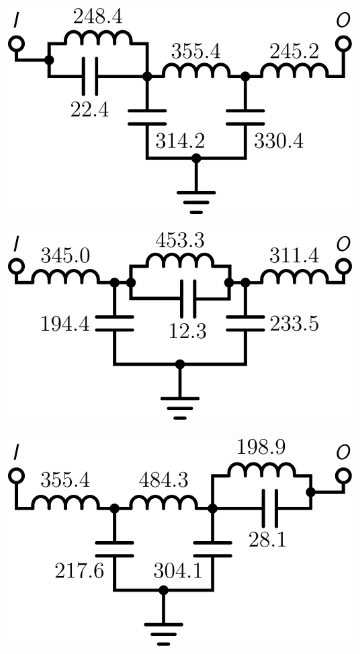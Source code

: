 \begin{figure}[h!]
\begin{subfigure}[t]{0.25\textwidth}
\centering
\includegraphics[scale = 0.14]{../app2/figures/(4)}
\caption{}
\end{subfigure}%
\begin{subfigure}[t]{0.25\textwidth}
\centering
\includegraphics[scale = 0.14]{../ch6/figures/lpf3_circuit4}
\caption{}
\end{subfigure}%
\begin{subfigure}[t]{0.25\textwidth}
\centering
\includegraphics[scale = 0.14]{../ch6/figures/lpf3_circuit2}
\caption{}
\end{subfigure}%


\end{figure}

